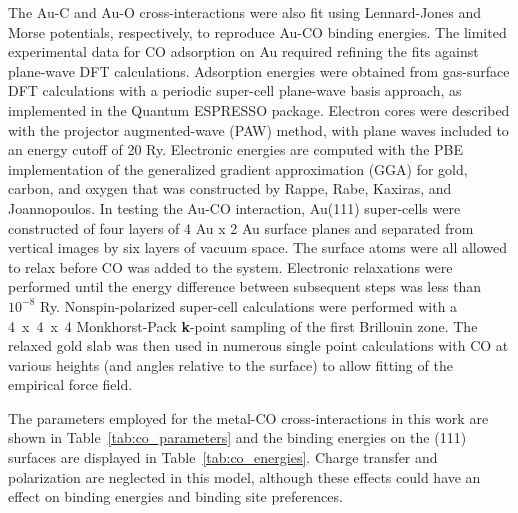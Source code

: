 The Au-C and Au-O cross-interactions were also fit using Lennard-Jones and
Morse potentials, respectively, to reproduce Au-CO binding energies.
The limited experimental data for CO adsorption on Au required refining the fits against plane-wave DFT calculations.
Adsorption energies were obtained from gas-surface DFT calculations with a
periodic super-cell plane-wave basis approach, as implemented in the
Quantum ESPRESSO package.\citep{Giannozzi:2009fe} Electron cores were
described with the projector augmented-wave (PAW)
method,\citep{Blochl:1994vf, Kresse:1999by} with plane waves
included to an energy cutoff of 20 Ry. Electronic energies are
computed with the PBE implementation of the generalized gradient
approximation (GGA) for gold, carbon, and oxygen that was constructed
by Rappe, Rabe, Kaxiras, and Joannopoulos.\citep{Perdew:1996fq, Rappe:1990tw}
In testing the Au-CO interaction, Au(111) super-cells were constructed of four layers of 4
Au x 2 Au surface planes and separated from vertical images by six
layers of vacuum space. The surface atoms were all allowed to relax 
before CO was added to the system. Electronic relaxations were 
performed until the energy difference between subsequent steps 
was less than $10^{-8}$ Ry.   Nonspin-polarized super-cell calculations 
were performed with a 4~x~4~x~4 Monkhorst-Pack {\bf k}-point sampling of the first Brillouin
zone.\citep{Monkhorst:1976il} The relaxed gold slab was
then used in numerous single point calculations with CO at various
heights (and angles relative to the surface) to allow fitting of the
empirical force field.

The parameters employed for the metal-CO cross-interactions in this work 
are shown in Table~\ref{tab:co_parameters} and the binding energies on the 
(111) surfaces are displayed in Table~\ref{tab:co_energies}.  Charge transfer
and polarization are neglected in this model, although these effects could have 
an effect on binding energies and binding site preferences.

